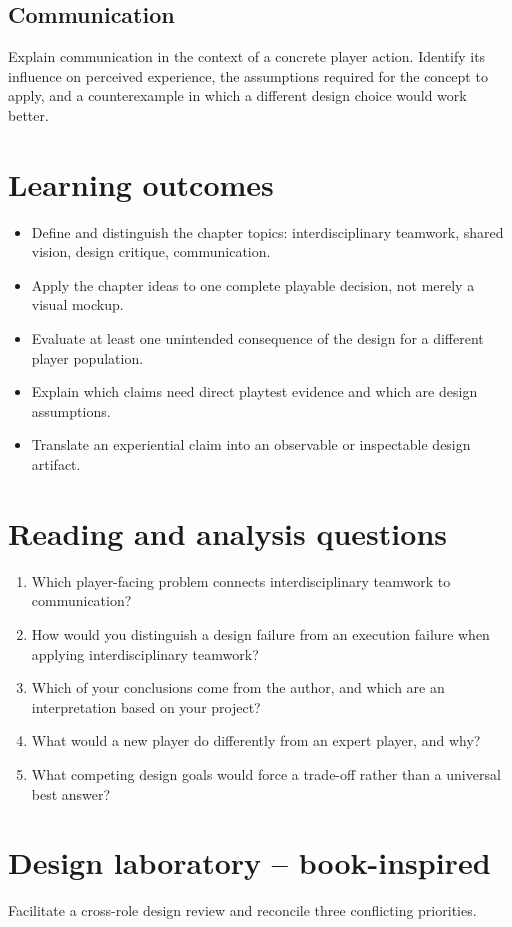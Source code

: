 \documentclass[11pt]{article}
\begin{document}
\subsection{Communication}
Explain communication in the context of a concrete player action. Identify its influence on perceived experience, the assumptions required for the concept to apply, and a counterexample in which a different design choice would work better.


\section{Learning outcomes}
\begin{itemize}
\item Define and distinguish the chapter topics: interdisciplinary teamwork, shared vision, design critique, communication.
\item Apply the chapter ideas to one complete playable decision, not merely a visual mockup.
\item Evaluate at least one unintended consequence of the design for a different player population.
\item Explain which claims need direct playtest evidence and which are design assumptions.
\item Translate an experiential claim into an observable or inspectable design artifact.
\end{itemize}

\section{Reading and analysis questions}
\begin{enumerate}
\item Which player-facing problem connects interdisciplinary teamwork to communication?
\item How would you distinguish a design failure from an execution failure when applying interdisciplinary teamwork?
\item Which of your conclusions come from the author, and which are an interpretation based on your project?
\item What would a new player do differently from an expert player, and why?
\item What competing design goals would force a trade-off rather than a universal best answer?
\end{enumerate}

\section{Design laboratory -- book-inspired}
Facilitate a cross-role design review and reconcile three conflicting priorities.
\end{document}
